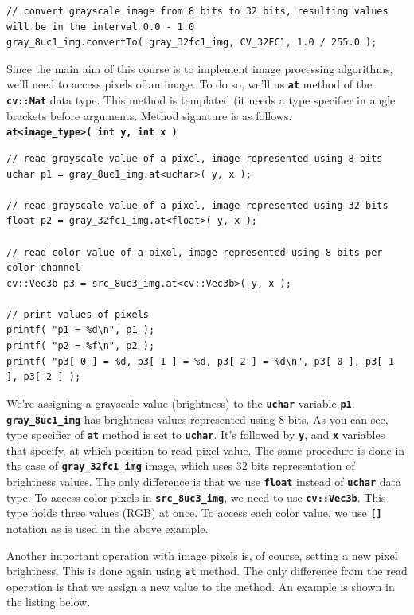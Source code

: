\documentclass[10pt]{article}
\newcommand{\code}[1]{\textbf{\texttt{#1}}}
\newcommand{\tuchar}[0]{\code{uchar}}
\newcommand{\tfloat}{\code{float}}
\begin{document}
\begin{lstlisting}[style=CStyle,caption={Converting an image represented using \code{uchar}s to an image represented by \code{float}s.},label={lst:convertto}]
// convert grayscale image from 8 bits to 32 bits, resulting values will be in the interval 0.0 - 1.0
gray_8uc1_img.convertTo( gray_32fc1_img, CV_32FC1, 1.0 / 255.0 );
\end{lstlisting}

Since the main aim of this course is to implement image processing algorithms, we'll need to access pixels of an image.
To do so, we'll us \code{at} method of the \code{cv::Mat} data type.
This method is templated (it needs a type specifier in angle brackets before arguments. Method signature is as follows.
\\
\code{at<image\_type>( int y, int x )}

\begin{lstlisting}[style=CStyle,caption={Accessing pixels.},label={lst:pixel-access}]
// read grayscale value of a pixel, image represented using 8 bits
uchar p1 = gray_8uc1_img.at<uchar>( y, x );

// read grayscale value of a pixel, image represented using 32 bits
float p2 = gray_32fc1_img.at<float>( y, x );

// read color value of a pixel, image represented using 8 bits per color channel
cv::Vec3b p3 = src_8uc3_img.at<cv::Vec3b>( y, x );

// print values of pixels
printf( "p1 = %d\n", p1 );
printf( "p2 = %f\n", p2 );
printf( "p3[ 0 ] = %d, p3[ 1 ] = %d, p3[ 2 ] = %d\n", p3[ 0 ], p3[ 1 ], p3[ 2 ] );
\end{lstlisting}

We're assigning a grayscale value (brightness) to the \tuchar{} variable \code{p1}.
\code{gray\_8uc1\_img} has brightness values represented using 8 bits. As you can see, type specifier
of \code{at} method is set to \tuchar{}. It's followed by \code{y}, and \code{x} variables that specify,
at which position to read pixel value.
The same procedure is done in the case of \code{gray\_32fc1\_img} image, which uses 32 bits representation
of brightness values. The only difference is that we use \tfloat{} instead of \tuchar{} data type.
To access color pixels in \code{src\_8uc3\_img}, we need to use \code{cv::Vec3b}.
This type holds three values (RGB) at once. To access each color value, we use \code{[]} notation as is used
in the above example.

Another important operation with image pixels is, of course, setting a new pixel brightness.
This is done again using \code{at} method. The only difference from the read operation is that we assign
a new value to the method. An example is shown in the listing below.
\end{document}
